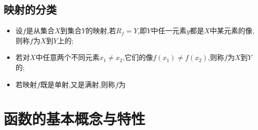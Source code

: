 \documentclass[12pt, a4paper, oneside, UTF8]{ctexbook}  %
\begin{document}
\subsection{映射的分类}
\begin{itemize}
    \item 设$f$是从集合$X$到集合$Y$的映射,若$R_f=Y$,即$Y$中任一元素$y$都是$X$中某元素的像,则称$f$为$X$到$Y$上的;
    \item 若对$X$中任意两个不同元素$x_1 \neq x_2$,它们的像$f(x_1) \neq f(x_2)$,则称$f$为$X$到$Y$的;
    \item 若映射$f$既是单射,又是满射,则称$f$为
\end{itemize}
\section{函数的基本概念与特性}
\end{document}
